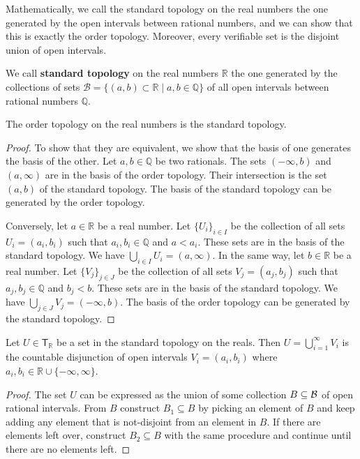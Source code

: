 \documentclass[11pt,letterpaper,fleqn]{memoir} %
\begin{document}
Mathematically, we call the standard topology on the real numbers the one generated by the open intervals between rational numbers, and we can show that this is exactly the order topology. Moreover, every verifiable set is the disjoint union of open intervals.

\begin{mathSection}
	\begin{defn}
		We call \textbf{standard topology} on the real numbers $\mathbb{R}$ the one generated by the collections of sets $\mathcal{B} = \{ (a,b) \subset \mathbb{R} \; | \; a,b \in \mathbb{Q} \}$ of all open intervals between rational numbers $\mathbb{Q}$.
	\end{defn}
	\begin{prop}
	The order topology on the real numbers is the standard topology.
\end{prop}
\begin{proof}
	To show that they are equivalent, we show that the basis of one generates the basis of the other. Let $a,b \in \mathbb{Q}$ be two rationals. The sets $(-\infty, b)$ and $(a, \infty)$ are in the basis of the order topology. Their intersection is the set $(a, b)$ of the standard topology. The basis of the standard topology can be generated by the order topology.
	
	Conversely, let $a \in \mathbb{R}$ be a real number. Let $\{U_i\}_{i \in I}$ be the collection of all sets $U_i = (a_i, b_i)$ such that $a_i, b_i \in \mathbb{Q}$ and $a < a_i$. These sets are in the basis of the standard topology. We have $\bigcup\limits_{i \in I} U_i = (a, \infty)$. In the same way, let $b \in \mathbb{R}$ be a real number. Let $\{V_j\}_{j \in J}$ be the collection of all sets $V_j = (a_j, b_j)$ such that $a_j, b_j \in \mathbb{Q}$ and $b_j < b$. These sets are in the basis of the standard topology. We have $\bigcup\limits_{j \in J} V_j = (-\infty, b)$. The basis of the order topology can be generated by the standard topology.
\end{proof}
\begin{prop}\label{3_prop_real_open_sets_are_intervals}
	Let $U \in \mathsf{T}_\mathbb{R}$ be a set in the standard topology on the reals. Then $U = \bigcup\limits_{i=1}^{\infty} V_i$ is the countable disjunction of open intervals $V_i = (a_i,b_i)$ where $a_i, b_i \in \mathbb{R} \cup \{ -\infty, \infty \}$.
\end{prop}
\begin{proof}
	The set $U$ can be expressed as the union of some collection $B \subseteq \mathcal{B}$ of open rational intervals. From $B$ construct $B_1 \subseteq B$ by picking an element of $B$ and keep adding any element that is not-disjoint from an element in $B$. If there are elements left over, construct $B_2 \subseteq B$ with the same procedure and continue until there are no elements left.
	

\end{proof}
\end{mathSection}
\end{document}
